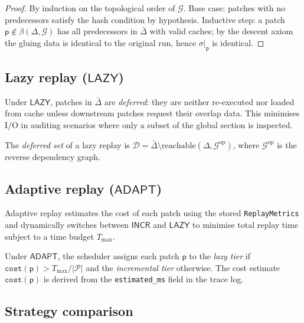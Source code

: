 \documentclass[11pt]{article}
\newcommand{\Patch}{\mathsf{p}}
\newcommand{\PatchSet}{\mathcal{P}}
\newcommand{\GS}{\sigma}                   %
\newcommand{\ChangedSet}{\Delta}
\newcommand{\UnchangedSet}{\bar\Delta}
\newcommand{\DepGraph}{\mathcal{G}}
\newcommand{\BlastRadius}{\beta}
\newcommand{\StratInc}{\mathsf{INCR}}
\newcommand{\StratLazy}{\mathsf{LAZY}}
\newcommand{\StratAdapt}{\mathsf{ADAPT}}
\begin{document}
\begin{proof}
By induction on the topological order of $\DepGraph$.  Base case:
patches with no predecessors satisfy the hash condition by hypothesis.
Inductive step: a patch $\Patch \notin \BlastRadius(\ChangedSet,
\DepGraph)$ has all predecessors in $\UnchangedSet$ with valid caches; by
the descent axiom the gluing data is identical to the original run,
hence $\GS|_\Patch$ is identical.
\end{proof}

\subsection{Lazy replay (\texorpdfstring{$\StratLazy$}{LAZY})}

Under $\StratLazy$, patches in $\UnchangedSet$ are \emph{deferred}: they
are neither re-executed nor loaded from cache unless downstream patches
request their overlap data.  This minimises I/O in auditing scenarios
where only a subset of the global section is inspected.

\begin{definition}
The \emph{deferred set} of a lazy replay is
$\mathcal{D} = \UnchangedSet \setminus \mathrm{reachable}(\ChangedSet,
\DepGraph^{\mathrm{op}})$, where $\DepGraph^{\mathrm{op}}$ is the
reverse dependency graph.
\end{definition}

\subsection{Adaptive replay (\texorpdfstring{$\StratAdapt$}{ADAPT})}

Adaptive replay estimates the cost of each patch using the stored
\texttt{ReplayMetrics} and dynamically switches between $\StratInc$ and
$\StratLazy$ to minimise total replay time subject to a time budget
$T_{\max}$.

\begin{definition}
Under $\StratAdapt$, the scheduler assigns each patch $\Patch$ to the
\emph{lazy tier} if
$\mathtt{cost}(\Patch) > T_{\max}/|\PatchSet|$
and the \emph{incremental tier} otherwise.  The cost estimate
$\mathtt{cost}(\Patch)$ is derived from the \texttt{estimated\_ms} field
in the trace log.
\end{definition}

\subsection{Strategy comparison}
\end{document}
